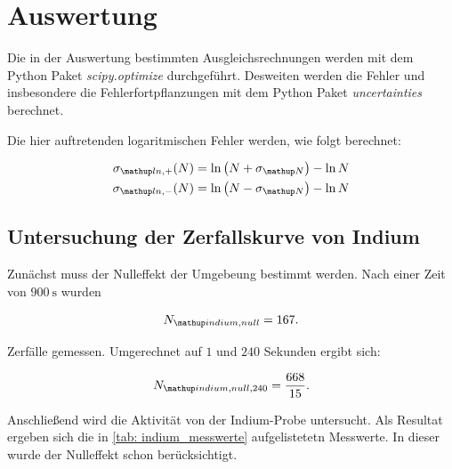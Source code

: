 \section{Auswertung}

Die in der Auswertung bestimmten Ausgleichsrechnungen werden mit
dem Python Paket \emph{scipy.optimize}\cite{scipy} durchgeführt.
Desweiten werden die Fehler und insbesondere die Fehlerfortpflanzungen
mit dem Python Paket \emph{uncertainties}\cite{uncertainties} berechnet.

Die hier auftretenden logaritmischen Fehler werden, wie folgt berechnet:

\begin{align}
  \label{eq:log_fehler}
  \begin{aligned}
    \sigma\ua{ln,+}(N)=\ln{\left(N+\sigma\ua{N}\right)}-\ln{N}\\
    \sigma\ua{ln,-}(N)=\ln{\left(N-\sigma\ua{N}\right)}-\ln{N}
  \end{aligned}
\end{align}
\subsection{Untersuchung der Zerfallskurve von Indium}
Zunächst muss der Nulleffekt der Umgebeung bestimmt werden.
Nach einer Zeit von $\SI{900}{\second}$ wurden

\begin{equation*}
  N\ua{indium,null}=167.
\end{equation*}

Zerfälle gemessen. Umgerechnet auf $1$ und $240$ Sekunden ergibt sich:

\begin{equation}
  \label{eq:nulleffekt_indium}
   N\ua{indium,null,240}=\frac{668}{15}.
\end{equation}

Anschließend wird die Aktivität von der Indium-Probe untersucht.
Als Resultat ergeben sich die in \ref{tab: indium_messwerte} aufgelistetetn Messwerte.
In dieser wurde der Nulleffekt schon berücksichtigt.


